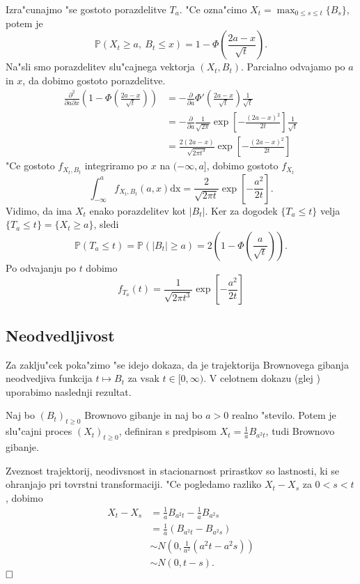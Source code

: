 \documentclass[twoside,11pt]{article}
\begin{document}
Izra"cunajmo "se gostoto porazdelitve $T_a$. "Ce ozna"cimo $X_t = \max_{0\leq s\leq t}\{B_s\}$, potem je 
$$
    \mathbb{P}\left(X_t \geq a, \ B_t \leq x\right) = 1 - \varPhi\left(\frac{2a - x}{\sqrt{t}}\right).
$$
Na"sli smo porazdelitev slu"cajnega vektorja $(X_t, B_t)$. Parcialno odvajamo po $a$ in $x$, da dobimo gostoto porazdelitve. %
\begin{align*}
    \frac{\partial^2}{\partial a \partial x}\left(1 - \varPhi\left(\frac{2a - x}{\sqrt{t}}\right)\right) &= -\frac{\partial}{\partial a}\varPhi'\left(\frac{2a - x}{\sqrt{t}}\right)\frac{1}{\sqrt{t}} \\
    &= -\frac{\partial}{\partial a}\frac{1}{\sqrt{2\pi}}\exp\left[-\frac{(2a - x)^2}{2t}\right]\frac{1}{\sqrt{t}} \\
    &= \frac{2(2a - x)}{\sqrt{2\pi t^3}}\exp\left[-\frac{(2a - x)^2}{2t}\right]
\end{align*}
"Ce gostoto $f_{X_t, B_t}$ integriramo  po $x$  na $(-\infty, a]$, dobimo gostoto $f_{X_t}$ 
$$
    \int_{-\infty}^a f_{X_t, B_t}(a, x)\text{dx} = \frac{2}{\sqrt{2\pi t}}\exp\left[-\frac{a^2}{2t}\right].
$$
Vidimo, da ima $X_t$ enako porazdelitev kot $|B_t|$.
Ker za dogodek  $\{T_a \leq t\}$ velja $\{T_a \leq t\} = \{X_t \geq a\}$, sledi 
$$
    \mathbb{P}(T_a \leq t) = \mathbb{P}(|B_t| \geq a) = 2\left(1 - \varPhi\left(\frac{a}{\sqrt{t}}\right)\right).
$$
Po odvajanju po $t$ dobimo
$$
    f_{T_a}(t) = \frac{1}{\sqrt{2\pi t^3}}\exp\left[-\frac{a^2}{2t}\right]
$$

\subsection{Neodvedljivost}
Za zaklju"cek poka"zimo "se idejo dokaza, da je trajektorija Brownovega gibanja neodvedjiva funkcija $t \mapsto B_t$ za vsak $t \in [0, \infty)$. V celotnem dokazu (glej \cite{1}) uporabimo naslednji rezultat.

\begin{lema}
    Naj bo $(B_t)_{t\geq 0}$ Brownovo gibanje in naj bo $a>0$ realno "stevilo. Potem je slu"cajni proces $(X_t)_{t\geq0}$, definiran s predpisom $X_t = \tfrac{1}{a}B_{a^2t}$, tudi Brownovo gibanje.
\end{lema}

\begin{dokaz}
    Zveznost trajektorij, neodivsnost in stacionarnost prirastkov so lastnosti, ki se ohranjajo pri tovrstni transformaciji. "Ce pogledamo razliko $X_t - X_s$ 
    za $0 < s < t$, dobimo
    \begin{align*}
        X_t - X_s &= \tfrac{1}{a}B_{a^2t} - \tfrac{1}{a}B_{a^2s} \\
        &= \tfrac{1}{a}\left(B_{a^2t} - B_{a^2s}\right) \\
       &\sim N\left(0, \tfrac{1}{a^2}(a^2t - a^2s)\right) \\
       &\sim N(0, t-s).
    \end{align*}
    $\hfill \square$
\end{dokaz}
\end{document}
